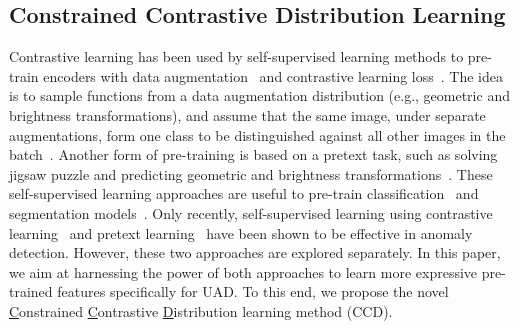\documentclass[runningheads]{llncs}
\begin{document}
\subsection{Constrained Contrastive Distribution Learning}
\label{sec:contrastive_and_pretext}

Contrastive learning has been used by self-supervised learning methods to pre-train encoders with data augmentation~\cite{simclr,moco,wang2020understanding} and contrastive learning loss~\cite{sohn2016improved}.  The idea is to sample functions from a data augmentation distribution (e.g., geometric and brightness transformations), and assume that the same image, under separate augmentations, form one class to be distinguished against all other images in the batch~\cite{bergman2020classification,golan2018deep}.  
Another form of pre-training is based on a pretext task, such as solving jigsaw puzzle and predicting geometric and brightness transformations~\cite{simclr,moco}. 
These self-supervised learning approaches are useful to pre-train classification~\cite{simclr,moco} and segmentation models~\cite{yi2020patch,noroozi2016unsupervised}.
Only recently, self-supervised learning 
using contrastive learning~\cite{sohn2020learning} and pretext learning~\cite{golan2018deep,bergman2020classification} have been shown to be effective in anomaly detection. 
However, these two approaches are explored separately. In this paper, we aim at harnessing the power of both approaches to learn more expressive pre-trained features specifically for UAD. 
To this end, we propose the novel \underline{C}onstrained \underline{C}ontrastive \underline{D}istribution learning method (CCD).
\end{document}
